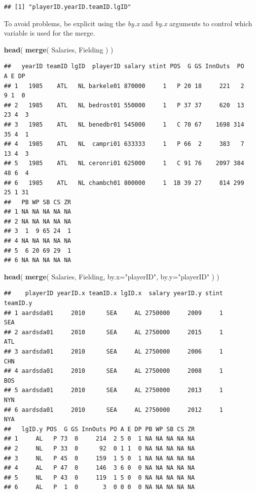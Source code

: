 \documentclass[]{book}
\newenvironment{Shaded}{\begin{snugshade}}{\end{snugshade}}
\newcommand{\DataTypeTok}[1]{\textcolor[rgb]{0.13,0.29,0.53}{#1}}
\newcommand{\KeywordTok}[1]{\textcolor[rgb]{0.13,0.29,0.53}{\textbf{#1}}}
\newcommand{\NormalTok}[1]{#1}
\newcommand{\StringTok}[1]{\textcolor[rgb]{0.31,0.60,0.02}{#1}}
\theoremstyle{definition}
\theoremstyle{definition}
\theoremstyle{definition}
\theoremstyle{remark}
\begin{document}
\begin{verbatim}
## [1] "playerID.yearID.teamID.lgID"
\end{verbatim}

To avoid problems, be explicit using the \emph{by.x} and \emph{by.x}
arguments to control which variable is used for the merge.

\begin{Shaded}
\begin{Highlighting}[]
\KeywordTok{head}\NormalTok{( }\KeywordTok{merge}\NormalTok{( Salaries, Fielding ) )}
\end{Highlighting}
\end{Shaded}

\begin{verbatim}
##   yearID teamID lgID  playerID salary stint POS  G GS InnOuts  PO  A E DP
## 1   1985    ATL   NL barkele01 870000     1   P 20 18     221   2  9 1  0
## 2   1985    ATL   NL bedrost01 550000     1   P 37 37     620  13 23 4  3
## 3   1985    ATL   NL benedbr01 545000     1   C 70 67    1698 314 35 4  1
## 4   1985    ATL   NL  campri01 633333     1   P 66  2     383   7 13 4  3
## 5   1985    ATL   NL ceronri01 625000     1   C 91 76    2097 384 48 6  4
## 6   1985    ATL   NL chambch01 800000     1  1B 39 27     814 299 25 1 31
##   PB WP SB CS ZR
## 1 NA NA NA NA NA
## 2 NA NA NA NA NA
## 3  1  9 65 24  1
## 4 NA NA NA NA NA
## 5  6 20 69 29  1
## 6 NA NA NA NA NA
\end{verbatim}

\begin{Shaded}
\begin{Highlighting}[]
\KeywordTok{head}\NormalTok{( }\KeywordTok{merge}\NormalTok{( Salaries, Fielding, }\DataTypeTok{by.x=}\StringTok{"playerID"}\NormalTok{, }\DataTypeTok{by.y=}\StringTok{"playerID"}\NormalTok{ ) )}
\end{Highlighting}
\end{Shaded}

\begin{verbatim}
##    playerID yearID.x teamID.x lgID.x  salary yearID.y stint teamID.y
## 1 aardsda01     2010      SEA     AL 2750000     2009     1      SEA
## 2 aardsda01     2010      SEA     AL 2750000     2015     1      ATL
## 3 aardsda01     2010      SEA     AL 2750000     2006     1      CHN
## 4 aardsda01     2010      SEA     AL 2750000     2008     1      BOS
## 5 aardsda01     2010      SEA     AL 2750000     2013     1      NYN
## 6 aardsda01     2010      SEA     AL 2750000     2012     1      NYA
##   lgID.y POS  G GS InnOuts PO A E DP PB WP SB CS ZR
## 1     AL   P 73  0     214  2 5 0  1 NA NA NA NA NA
## 2     NL   P 33  0      92  0 1 1  0 NA NA NA NA NA
## 3     NL   P 45  0     159  1 5 0  1 NA NA NA NA NA
## 4     AL   P 47  0     146  3 6 0  0 NA NA NA NA NA
## 5     NL   P 43  0     119  1 5 0  0 NA NA NA NA NA
## 6     AL   P  1  0       3  0 0 0  0 NA NA NA NA NA
\end{verbatim}
\end{document}

